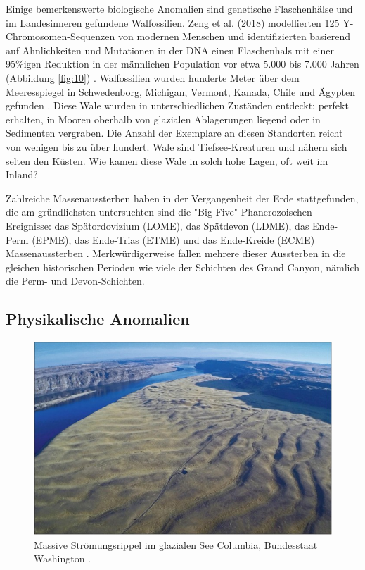 \documentclass[10pt,twocolumn,letterpaper]{article}
\begin{document}
Einige bemerkenswerte biologische Anomalien sind genetische Flaschenhälse und im Landesinneren gefundene Walfossilien. Zeng et al. (2018) modellierten 125 Y-Chromosomen-Sequenzen von modernen Menschen und identifizierten basierend auf Ähnlichkeiten und Mutationen in der DNA einen Flaschenhals mit einer 95\%igen Reduktion in der männlichen Population vor etwa 5.000 bis 7.000 Jahren (Abbildung \ref{fig:10}) \cite{62}. Walfossilien wurden hunderte Meter über dem Meeresspiegel in Schwedenborg, Michigan, Vermont, Kanada, Chile und Ägypten gefunden \cite{63,64,65,66}. Diese Wale wurden in unterschiedlichen Zuständen entdeckt: perfekt erhalten, in Mooren oberhalb von glazialen Ablagerungen liegend oder in Sedimenten vergraben. Die Anzahl der Exemplare an diesen Standorten reicht von wenigen bis zu über hundert. Wale sind Tiefsee-Kreaturen und nähern sich selten den Küsten. Wie kamen diese Wale in solch hohe Lagen, oft weit im Inland?

Zahlreiche Massenaussterben haben in der Vergangenheit der Erde stattgefunden, die am gründlichsten untersuchten sind die "Big Five"-Phanerozoischen Ereignisse: das Spätordovizium (LOME), das Spätdevon (LDME), das Ende-Perm (EPME), das Ende-Trias (ETME) und das Ende-Kreide (ECME) Massenaussterben \cite{88,89}. Merkwürdigerweise fallen mehrere dieser Aussterben in die gleichen historischen Perioden wie viele der Schichten des Grand Canyon, nämlich die Perm- und Devon-Schichten.

\subsection{Physikalische Anomalien}

\begin{figure}[b]
\begin{center}
   \includegraphics[width=1\linewidth]{columbia.jpg}
\end{center}
   \caption{Massive Strömungsrippel im glazialen See Columbia, Bundesstaat Washington \cite{80}.}
\label{fig:11}
\label{fig:onecol}
\end{figure}
\end{document}
